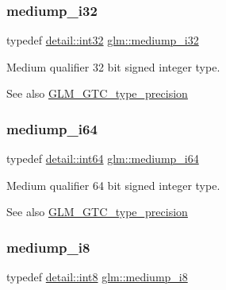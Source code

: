 \subsubsection{\texorpdfstring{mediump\+\_\+i32}{mediump\_i32}}
{\footnotesize\ttfamily typedef \mbox{\hyperlink{namespaceglm_1_1detail_a9f85b4efeca416cdcec2fd08939a2e17}{detail\+::int32}} \mbox{\hyperlink{group__gtc__type__precision_ga5e00ec824eb55968a6b6496f294d8c07}{glm\+::mediump\+\_\+i32}}}

Medium qualifier 32 bit signed integer type. \begin{DoxySeeAlso}{See also}
\mbox{\hyperlink{group__gtc__type__precision}{G\+L\+M\+\_\+\+G\+T\+C\+\_\+type\+\_\+precision}} 
\end{DoxySeeAlso}
\mbox{\label{group__gtc__type__precision_ga90fedf6c701ffbe00535156715e50787}} 
\subsubsection{\texorpdfstring{mediump\+\_\+i64}{mediump\_i64}}
{\footnotesize\ttfamily typedef \mbox{\hyperlink{namespaceglm_1_1detail_a5b1c3227ec636c24a0676746381adfc8}{detail\+::int64}} \mbox{\hyperlink{group__gtc__type__precision_ga90fedf6c701ffbe00535156715e50787}{glm\+::mediump\+\_\+i64}}}

Medium qualifier 64 bit signed integer type. \begin{DoxySeeAlso}{See also}
\mbox{\hyperlink{group__gtc__type__precision}{G\+L\+M\+\_\+\+G\+T\+C\+\_\+type\+\_\+precision}} 
\end{DoxySeeAlso}
\mbox{\label{group__gtc__type__precision_ga28a8b5fd51072680bb55178c17cc7411}} 
\subsubsection{\texorpdfstring{mediump\+\_\+i8}{mediump\_i8}}
{\footnotesize\ttfamily typedef \mbox{\hyperlink{namespaceglm_1_1detail_a04b526a8d7a9b455602a0afa78c531e0}{detail\+::int8}} \mbox{\hyperlink{group__gtc__type__precision_ga28a8b5fd51072680bb55178c17cc7411}{glm\+::mediump\+\_\+i8}}}

